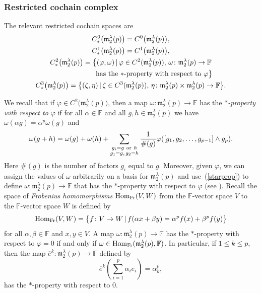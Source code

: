 \documentclass[pdftex]{sigma}
\def\Hom{\operatorname{Hom}}
\def\phi{\varphi}
\def\m{\mathfrak m}
\def\F{\mathbb F}
\numberwithin{equation}{section}
\begin{document}
\subsubsection{Restricted cochain complex}

The relevant restricted cochain spaces are
\begin{gather*}
 C^0_*\big(\m_2^\lambda(p)\big)= C^0\big(\m_2^\lambda(p)\big),\\
 C^1_*\big(\m_2^\lambda(p)\big)= C^1\big(\m_2^\lambda(p)\big),\\
 C^2_*\big(\m_2^\lambda(p)\big)=\big\{(\phi,\omega)\, |\, \phi\in C^2(\m_2^\lambda(p)),\, \omega\colon \m_2^\lambda(p)\to\F\\
\hphantom{C^2_*\big(\m_2^\lambda(p)\big)=\big\{}{} \text{\rm has the $*$-property with respect to $\phi$}\big\}\\
 C^3_*\big(\m_2^\lambda(p)\big)=\big\{(\zeta,\eta)\, |\, \zeta\in C^3(\m_2^\lambda(p)),\, \eta\colon \m_2^\lambda(p)\times\m_2^\lambda(p)\to\F \big\}.
\end{gather*}

We recall that if $\phi\in C^2\big(\m_2^\lambda(p)\big)$, then a map $\omega\colon \m_2^\lambda(p)\to\F$ has the {\it $*$-property with respect to $\phi$} if for all $\alpha\in\F$ and all $g,h\in \m_2^\lambda(p)$ we have $\omega(\alpha g)=\alpha^p\omega(g)$ and
\begin{gather} \label{starprop}
 \omega (g+h)=\omega (g)+ \omega (h) + \sum_{\substack{g_i=g\ {\rm or}\ h\\ g_1=g,\, g_2=h}} \frac{1}{\#(g)} \phi([g_1,g_2,\dots, g_{p-1}]\wedge g_p).
\end{gather} Here $\#(g)$ is the number of factors $g_i$ equal to $g$. Moreover, given $\phi$, we can assign the values of $\omega$ arbitrarily on a basis for $\m_2^\lambda(p)$ and use~(\ref{starprop}) to define $\omega\colon \m_2^\lambda(p)\to\F$ that has the $*$-property with respect to $\phi$ (see \cite[pp.~249--250]{EvFi2019}). Recall the space of {\it Frobenius homomorphisms} $\Hom_{\rm Fr}(V,W)$ from the $\F$-vector space $V$ to the $\F$-vector space $W$ is defined by
\[ \Hom_{\rm Fr}(V,W) = \big\{ f\colon V\to W\, |\, f(\alpha x+ \beta y) = \alpha^p f(x) + \beta^p f(y)\big\}\] for all $\alpha,\beta\in\F$ and
$x,y\in V$. A map $\omega\colon \m_2^\lambda(p)\to\F$ has the $*$-property with respect to $\phi=0$ if and only if $\omega\in\Hom_{\rm Fr}(\m_2^\lambda(p),\F)$. In particular, if
$1\le k\le p$, then the map $\overline e^k\colon \m_2^\lambda(p)\to\F$ defined by
\[\overline e^k\left (\sum_{i=1}^p \alpha_ie_i\right ) = \alpha_k^p,\]
has the $*$-property with respect to $0$.
\end{document}
